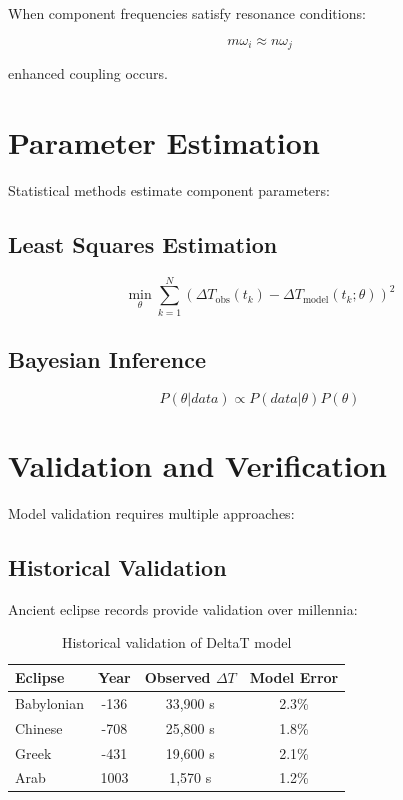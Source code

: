 \documentclass[12pt,a4paper]{report}
\begin{document}
When component frequencies satisfy resonance conditions:

\[
m\omega_i \approx n\omega_j
\]

enhanced coupling occurs.

\section{Parameter Estimation}

Statistical methods estimate component parameters:

\subsection{Least Squares Estimation}

\[
\min_{\theta} \sum_{k=1}^{N} \left(\Delta T_{\text{obs}}(t_k) - \Delta T_{\text{model}}(t_k; \theta)\right)^2
\]

\subsection{Bayesian Inference}

\[
P(\theta|data) \propto P(data|\theta) P(\theta)
\]

\section{Validation and Verification}

Model validation requires multiple approaches:

\subsection{Historical Validation}

Ancient eclipse records provide validation over millennia:

\begin{table}[h]
\centering
\begin{tabular}{|l|c|c|c|}
\hline
\textbf{Eclipse} & \textbf{Year} & \textbf{Observed $\Delta T$} & \textbf{Model Error} \\
\hline
Babylonian & -136 & 33,900 s & 2.3\% \\
Chinese & -708 & 25,800 s & 1.8\% \\
Greek & -431 & 19,600 s & 2.1\% \\
Arab & 1003 & 1,570 s & 1.2\% \\
\hline
\end{tabular}
\caption{Historical validation of DeltaT model}
\end{table}
\end{document}
